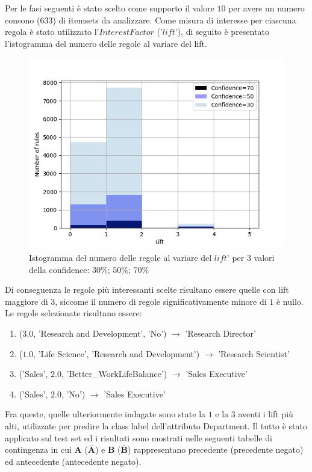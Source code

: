 \documentclass[a4paper,9pt]{article}
\begin{document}
Per le fasi seguenti è stato scelto come supporto il valore $10$ per avere un numero consono ($633$) di itemsets da analizzare.
Come misura di interesse per ciascuna regola è stato utilizzato l'$Interest Factor$ ('$lift$'), di seguito è presentato l'istogramma del numero delle regole al variare del lift.  

\begin{figure}[H]
    \centering
    \includegraphics[scale=0.70]{lifthistogram.png}
    \caption{Istogramma del numero delle regole al variare del $lift$' per $3$ valori della confidence: $30\%$; $50\%$; $70\%$}
    \label{fig:my_label}
\end{figure}

Di conseguenza le regole più interessanti scelte risultano essere quelle con lift maggiore di $3$, siccome il numero di regole significativamente  minore di $1$ è nullo. Le regole selezionate risultano essere:

\begin{enumerate}
\item ($3.0$, 'Research and Development', 'No') $\longrightarrow$ 'Research Director'
\item ($1.0$, 'Life Science', 'Research and Development') $\longrightarrow$ 'Research Scientist'
\item ('Sales', $2.0$, 'Better\_WorkLifeBalance') $\longrightarrow$ 'Sales Executive'
\item ('Sales', $2.0$, 'No') $\longrightarrow$ 'Sales Executive'
\end{enumerate}

Fra queste, quelle ulteriormente indagate sono state la $1$ e la $3$ aventi i lift più alti, utilizzate per predire la class label dell'attributo Department. Il tutto è stato applicato sul test set ed i risultati sono mostrati nelle seguenti tabelle di contingenza in cui \textbf {A}  ($\bar{\textbf {A}}$) e \textbf {B}  ($\bar{\textbf {B}}$) rappresentano precedente (precedente negato) ed antecedente (antecedente negato). 
\end{document}
